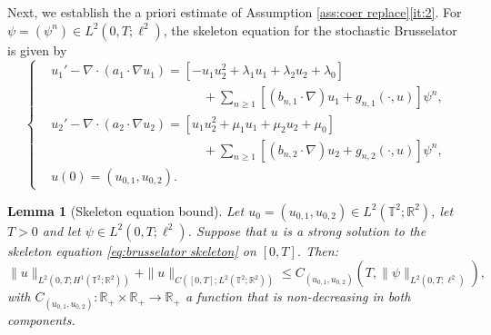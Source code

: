 \documentclass{amsart}
\newcommand{\<}{\langle}
\newcommand{\?}{\rangle}
\newcommand{\col}{\colon}
\newcommand{\Tor}{\mathbb{T}}
\renewcommand{\Tor}{\mathbb{T}^2}
\theoremstyle{plain}
\theoremstyle{remark}
\theoremstyle{plain}
\newtheorem{lemma}[theorem]{Lemma}
\numberwithin{equation}{section}
\def\R{{\mathbb R}}
\begin{document}
Next, we  establish the a priori estimate of Assumption \ref{ass:coer replace}\ref{it:2}. 
For $\psi=(\psi^n)\in L^2(0,T;\ell^2)$, the   skeleton equation for the stochastic Brusselator is given by 
\begin{equation}\label{eq:brusselator skeleton}
     \begin{cases}
   & u_1'-\nabla\cdot(a_1\cdot\nabla u_1) =[ -u_1u_2^2 +\lambda_1u_1+\lambda_2u_2+\lambda_0]  \\
   &\hspace{5cm} +\sum_{n\geq 1}[(b_{n,1}\cdot\nabla)u_1+g_{n,1}(\cdot,u)]  \psi^n,   \\
   & u_2'-\nabla\cdot(a_2\cdot\nabla u_2) =  [u_1u_2^2 +\mu_1u_1+\mu_2u_2+\mu_0] \\
   &\hspace{5cm}+\sum_{n\geq 1}[(b_{n,2}\cdot\nabla)u_2+g_{n,2}(\cdot,u)]  \psi^n,   \\
   &u(0)=(u_{0,1},u_{0,2}). 
\end{cases}
\end{equation}

  

\begin{lemma}[Skeleton equation bound]\label{lem:skeletonbrusselator}
Let $u_0=(u_{0,1},u_{0,2})\in  L^2(\Tor;\R^2)$, let $T>0$ and let $\psi\in L^2(0,T;\ell^2)$. Suppose that $u$ is a strong solution to the  skeleton equation \eqref{eq:brusselator skeleton} on $[0,T]$. Then:  
\begin{equation}\label{eq:apriori bruss skel}
   \|u\|_{L^2(0,T;H^1(\Tor;\R^2))}+\|u\|_{C([0,T]; L^2(\Tor;\R^2))}   \leq C_{(u_{0,1},u_{0,2})}({T},\|\psi\|_{L^2(0,{T};\ell^2)}),
  \end{equation}
   with $C_{(u_{0,1},u_{0,2})}\col \R_+\times \R_+\to\R_+$ a function that is non-decreasing in both components.   
\end{lemma}
\end{document}
